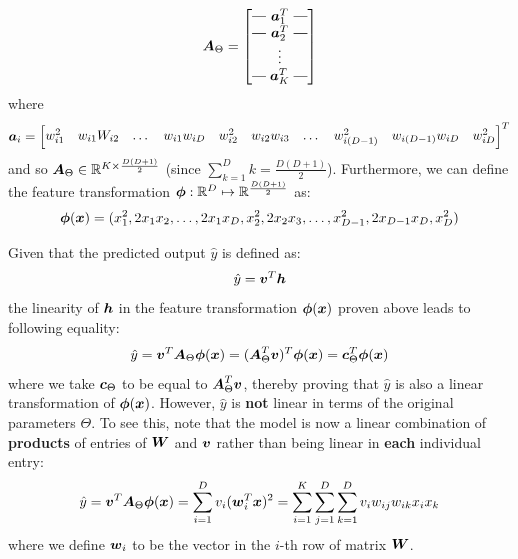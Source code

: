 \documentclass{exam}
\makeatletter
\newcommand{\brows}[1]{%
  \begin{bmatrix}
  \begin{array}{@{\protect\rotvert\;}c@{\;\protect\rotvert}}
  #1
  \end{array}
  \end{bmatrix}
}
\newcommand{\rotvert}{\rotatebox[origin=c]{90}{$\vert$}}
\newcommand{\rowsvdots}{\multicolumn{1}{@{}c@{}}{\vdots}}
\makeatother
\begin{document}
\begin{questions}
        \begin{equation*}
            \vb*{A}_{\Theta} = 
            \brows{\vb*{a}_1^T \\ \vb*{a}_2^T \\ \rowsvdots \\ \vb*{a}_K^T}
        \end{equation*}
        where
        \begin{equation*}
            \vb*{a}_i = 
            \begin{bmatrix}
            w_{i1}^2 & w_{i1}W_{i2} & \dots & w_{i1}w_{iD} & w_{i2}^2 & w_{i2}w_{i3} & \dots & w_{i(D - 1)}^2  & w_{i(D - 1)} w_{iD} &  w_{iD}^2
            \end{bmatrix}^T
        \end{equation*}
        and so $\vb*{A}_{\Theta} \in \mathbb{R}^{K \times \frac{D(D + 1)}{2}}$ (since $\sum_{k = 1}^{D} k = \frac{D(D + 1)}{2}$). Furthermore, we can define the feature transformation $\vb*{\phi} : \mathbb{R}^D \mapsto  \mathbb{R}^{\frac{D(D + 1)}{2}}$ as:
        \begin{equation*}
            \vb*{\phi}(\vb*{x}) = (x_1^2, 2x_1 x_2, \dots, 2x_1 x_D, x_2^2, 2x_2 x_3, \dots, x_{D - 1}^2, 2x_{D - 1} x_{D}, x_{D}^2)
        \end{equation*}

        \question
        Given that the predicted output $\hat{y}$ is defined as:
        \[
            \hat{y} = \vb*{v}^T \vb*{h}
        \]
        the linearity of $\vb*{h}$ in the feature transformation $\vb*{\phi}(\vb*{x})$ proven above leads to following equality:
        \[
            \hat{y} = \vb*{v}^T \vb*{A}_{\Theta} \vb*{\phi}(\vb*{x}) 
                    = (\vb*{A}_{\Theta}^T \vb*{v})^T \vb*{\phi}(\vb*{x}) 
                    = \vb*{c}_{\Theta}^T \vb*{\phi}(\vb*{x}) 
        \]
        where we take $\vb*{c}_{\Theta}$ to be equal to $\vb*{A}_{\Theta}^T \vb*{v}$, thereby proving that $\hat{y}$ is also a linear transformation of $\vb*{\phi}(\vb*{x})$. However, $\hat{y}$ is \textbf{not} linear in terms of the original parameters $\Theta$. To see this, note that the model is now a linear combination of \textbf{products} of entries of $\vb*{W}$ and $\vb*{v}$ rather than being linear in \textbf{each} individual entry:
        \[
            \hat{y} = \vb*{v}^T \vb*{A}_{\Theta} \vb*{\phi}(\vb*{x}) = \sum_{i = 1}^{D} v_i (\vb*{w}_i^T \vb*{x})^2 
            = \sum_{i = 1}^{K} \sum_{j = 1}^{D} \sum_{k = 1}^{D} v_i w_{ij} w_{ik} x_i x_k
        \]
        where we define $\vb*{w}_i$ to be the vector in the $i$-th row of matrix $\vb*{W}$.


\end{questions}
\end{document}
